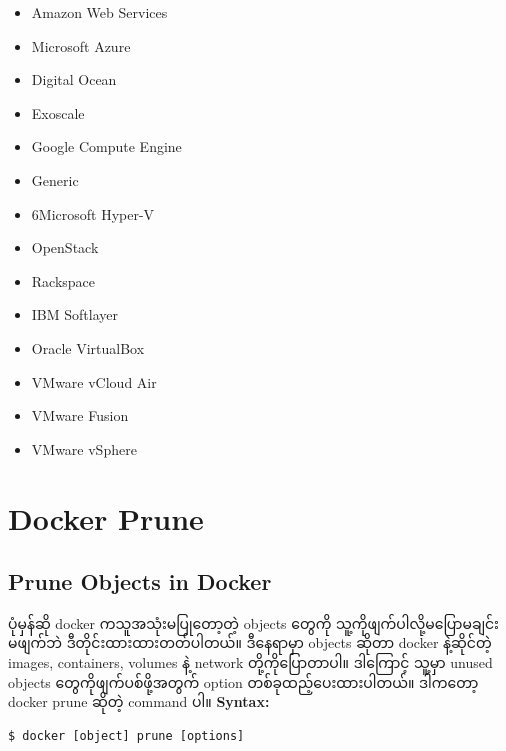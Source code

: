 \documentclass{article}
\begin{document}
\begin{itemize}
\itemsep1pt\parskip0pt
\item
  Amazon Web Services\\
\item
  Microsoft Azure\\
\item
  Digital Ocean\\
\item
  Exoscale\\
\item
  Google Compute Engine\\
\item
  Generic\\
\item
  6Microsoft Hyper-V\\
\item
  OpenStack\\
\item
  Rackspace\\
\item
  IBM Softlayer\\
\item
  Oracle VirtualBox\\
\item
  VMware vCloud Air\\
\item
  VMware Fusion\\
\item
  VMware vSphere
\end{itemize}

\pagebreak

\section{Docker Prune}\label{docker-prune}

\subsection{Prune Objects in Docker}\label{prune-objects-in-docker}

ပုံမှန်ဆို docker ကသူအသုံးမပြုတော့တဲ့ objects ‌တွေကို
သူ့ကိုဖျက်ပါလို့မပြောမချင်း မဖျက်ဘဲ ဒီတိုင်းထားထားတတ်ပါတယ်။ ဒီနေရာမှာ
objects ဆိုတာ docker နဲ့ဆိုင်တဲ့ images, containers, volumes နဲ့ network
တို့ကိုပြောတာပါ။ ဒါကြောင့် သူ့မှာ unused objects တွေကိုဖျက်ပစ်ဖို့အတွက်
option တစ်ခုထည့်ပေးထားပါတယ်။ ဒါကတော့ docker prune ဆိုတဲ့ command ပါ။
\textbf{Syntax:}

\begin{verbatim}
$ docker [object] prune [options]
\end{verbatim}
\end{document}
